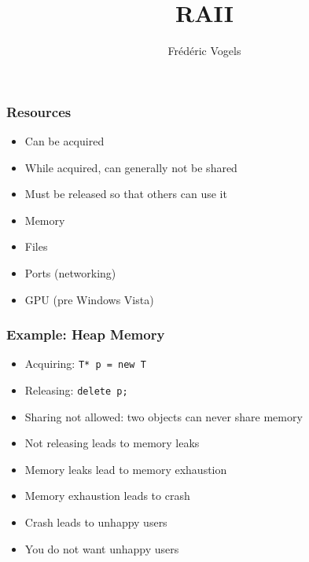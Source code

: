 

\usetikzlibrary{shadows,shapes.multipart}

\title{RAII}
\author{Fr\'ed\'eric Vogels}


\lstset{language=c++14}



\begin{frame}
  \titlepage
\end{frame}

\begin{frame}
  \frametitle{Resources}
  \begin{itemize}
    \item Can be acquired
    \item While acquired, can generally not be shared
    \item Must be released so that others can use it
  \end{itemize}
  \vskip5mm
  \begin{itemize}
    \item Memory
    \item Files
    \item Ports (networking)
    \item GPU (pre Windows Vista)
  \end{itemize}
\end{frame}

\begin{frame}
  \frametitle{Example: Heap Memory}
  \begin{itemize}
    \item Acquiring: {\tt T* p = new T}
    \item Releasing: {\tt delete p;}
    \item Sharing not allowed: two objects can never share memory
    \item Not releasing leads to memory leaks
    \item Memory leaks lead to memory exhaustion
    \item Memory exhaustion leads to crash
    \item Crash leads to unhappy users
    \item You do not want unhappy users
  \end{itemize}
\end{frame}

